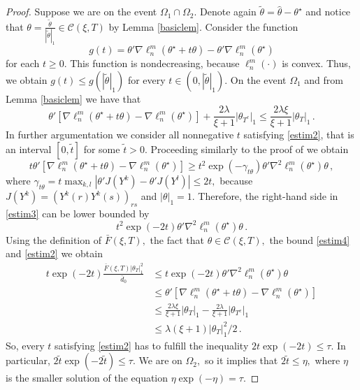 \documentclass[twoside,11pt]{article}
\def\llnm{\ell_n^m}
\def\th{\theta}
\def\cone{\mathcal{C}}
\def\tth{\tilde{\theta}}
\def\ths{\th^\star}
\def\hth{\hat{\theta}}
\def\rs{_{rs}}
\def\grad{\nabla}
\def\hess{\nabla^2}
\def\bd0{\bar{d} _0}
\def\bef{\bar{F}(\xi,T)}
\begin{document}
\begin{proof} Suppose we are on the event $\Omega_1 \cap \Omega_2.$ Denote again $\tth = \hth - \ths$ and notice that $\th = \frac{\tth}{|\tth|_1} \in \cone (\xi, T)$ by Lemma \ref{basiclem}.
Consider the function
\[
g(t) = \th ' \grad \llnm(\ths + t \th) -  \th ' \grad \llnm(\ths)
\]
for each $t \geq 0.$ This function is nondecreasing, because  $\llnm(\cdot) $ is convex.
Thus, we obtain 
$
g(t) \leq g(|\tth|_1)
$
for every $t \in (0,|\tth|_1) $.
On the event $\Omega_1$ and from Lemma \ref{basiclem} we have that 
\begin{equation}
\label{estim2}
\th ' \left[ \grad \llnm(\ths + t \th) -  \grad \llnm(\ths)
\right] + \frac{2 \lambda}{\xi +1} |\th _{T^c}|_1 \leq
\frac{2 \lambda \xi}{\xi +1} |\th _{T}|_1 \,.
\end{equation}
In further argumentation we consider all nonnegative $t$ satisfying \eqref{estim2}, that is an interval $[0,\tilde{t}]$ for some $\tilde{t} >0$.
Proceeding similarly to the proof of \citet[Lemma 3.2]{Cox13} we obtain 
\begin{equation}
\label{estim3}
t \th '  \left[ \grad \llnm(\ths + t \th) -  \grad \llnm(\ths)
\right] \geq t^2 \exp (- \gamma_{t \th}) \th ' \hess \llnm(\ths) \th\,,
\end{equation}
where $\gamma_{t \th }= t \max_{k,l} |\th ' J (Y^k) -\th ' J (Y^l) | \leq 2t,$ because $J(Y^k)= \left( Y^k (r) Y^k (s)\right) \rs$  and $|\th |_1 =1$.
Therefore, the right-hand side in \eqref{estim3} can be lower bounded by 
\begin{equation}
\label{estim4}
t^2 \exp (-2t) \th ' \hess \llnm(\ths) \th\,.
\end{equation}
Using the definition of $\bef ,$ the fact that $\th \in \cone (\xi,T), $ the bound \eqref{estim4}  and \eqref{estim2} we obtain
\begin{align*}
t \exp(-2t) \frac{\bef  |\th _T|_1^2}{\bd0} &\leq t \exp(-2t) \th ' \hess
\llnm(\ths) \th \\
&\leq \th '  \left[ \grad \llnm(\ths + t \th) -  \grad \llnm(\ths)
\right] \\
 &\leq \frac{2 \lambda \xi}{\xi +1} |\th _{T}|_1 -  \frac{2 \lambda}{\xi +1} |\th _{T^c}|_1\\
&\leq \lambda (\xi +1) |\th _T|_1^2 /2\,.
\end{align*}
So, every $t$ satisfying \eqref{estim2} has to fulfill the  inequality 
$
2t \exp(-2t) \leq \tau
$.
In particular, $2\tilde{t} \exp(-2\tilde{t}) \leq \tau.$ We are on $\Omega_2,$ so it implies that $2 \tilde{t} \leq \eta,$ where $\eta $ is the smaller solution of the equation $\eta \exp(-\eta) =\tau.$

\end{proof}
\end{document}
